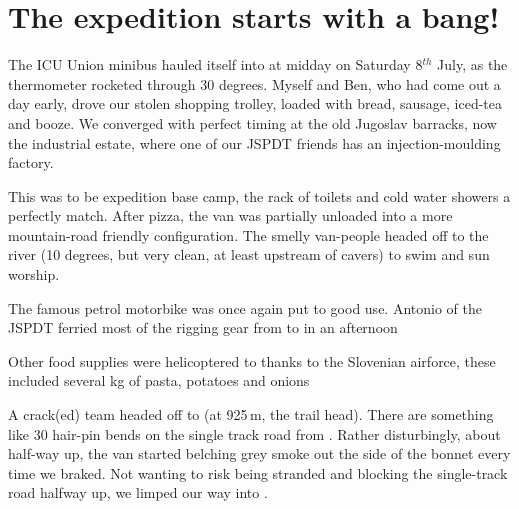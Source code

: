\section{The expedition starts with a bang!}
The ICU Union minibus hauled itself into  at midday on Saturday 8$^{th}$ July, as the thermometer rocketed through 30 degrees. Myself and Ben, who had come out a day early, drove our stolen shopping trolley, loaded with bread, sausage, iced-tea and booze. We converged with perfect timing at the old Jugoslav barracks, now the industrial estate, where one of our JSPDT friends has an injection-moulding factory. 

This was to be expedition base camp, the rack of toilets and cold water showers a perfectly match. After pizza, the van was partially unloaded into a more mountain-road friendly configuration. The smelly van-people headed off to the  river (10 degrees, but very clean, at least upstream of cavers) to swim and sun worship. 

\begin{marginfigure}
\checkoddpage \ifoddpage \forcerectofloat \else \forceversofloat \fi
\centering
{}
\caption{The famous petrol motorbike was once again put to good use. Antonio of the JSPDT ferried most of the rigging gear from \protect{} to \protect{} in an afternoon }
\label{motorbike}
\end{marginfigure}

\begin{marginfigure}
\checkoddpage \ifoddpage \forcerectofloat \else \forceversofloat \fi
\centering
{}
\caption{Other food supplies were helicoptered to \protect{} thanks to the Slovenian airforce, these included several kg of pasta, potatoes and onions }
\label{helicopter fratnik}
\end{marginfigure}

A crack(ed) team headed off to  (at 925\,m, the trail head). There are something like 30 hair-pin bends on the single track road from . Rather disturbingly, about half-way up, the van started belching  grey smoke out the side of the bonnet every time we braked. Not wanting to risk being stranded and blocking the single-track road halfway up, we limped our way into . 

